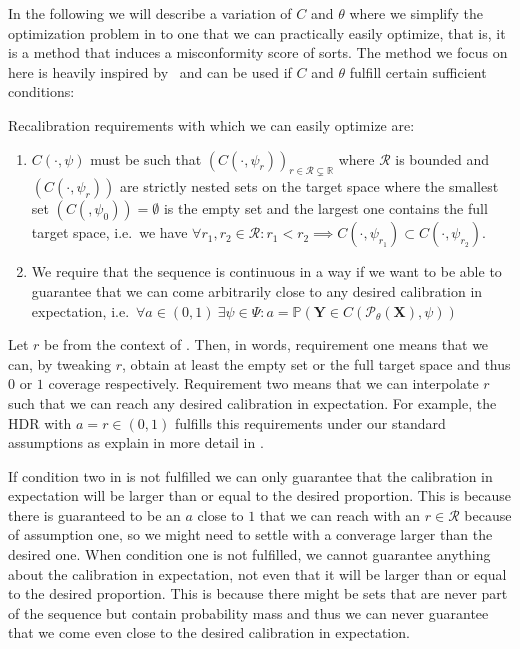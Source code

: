 In the following we will describe a variation of $C$ and $\theta$ where we simplify the optimization problem in  to one that we can practically easily optimize, that is, it is a method that induces a misconformity score of sorts. The method we focus on here is heavily inspired by~\cite{sesia2021conformal} and can be used if $C$ and $\theta$ fulfill certain sufficient conditions:

\begin{definition}\label{def:recalibration_requirements}

    Recalibration requirements with which we can easily optimize  are:
    \begin{enumerate}
        \item $C(\cdot,\psi)$ must be such that $\left(C\left(\cdot, \psi_r\right)\right)_{r \in \mathcal{R} \subsetneq \mathbb{R}}$ where $\mathcal{R}$ is bounded and $(C(\cdot,\psi_r))$ are strictly nested sets on the target space where the smallest set $(C(,\psi_0)) = \emptyset$ is the empty set and the largest one contains the full target space, i.e.\ we have $\forall r_1, r_2 \in \mathcal{R}: r_1 < r_2 \implies C(\cdot,\psi_{r_1}) \subset C(\cdot, \psi_{r_2})$.
        \item We require that the sequence is continuous in a way if we want to be able to guarantee that we can come arbitrarily close to any desired calibration in expectation, i.e.\ $\forall a\in(0,1)\ \exists \psi\in\Psi : a = \mathbb{P}(\mathbf{Y} \in C(\mathscr{P}_{\theta}(\mathbf{X}), \psi))$
    \end{enumerate}
\end{definition}

Let $r$ be from the context of . Then, in words, requirement one means that we can, by tweaking $r$, obtain at least the empty set or the full target space and thus $0$ or $1$ coverage respectively. Requirement two means that we can interpolate $r$ such that we can reach any desired calibration in expectation. For example, the HDR with $a = r \in (0,1)$ fulfills this requirements under our standard assumptions  as explain in more detail in .

If condition two in  is not fulfilled we can only guarantee that the calibration in expectation will be larger than or equal to the desired proportion. This is because there is guaranteed to be an $a$ close to $1$ that we can reach with an $r \in \mathcal{R}$ because of assumption one, so we might need to settle with a converage larger than the desired one. When condition one is not fulfilled, we cannot guarantee anything about the calibration in expectation, not even that it will be larger than or equal to the desired proportion. This is because there might be sets that are never part of the sequence but contain probability mass and thus we can never guarantee that we come even close to the desired calibration in expectation.

